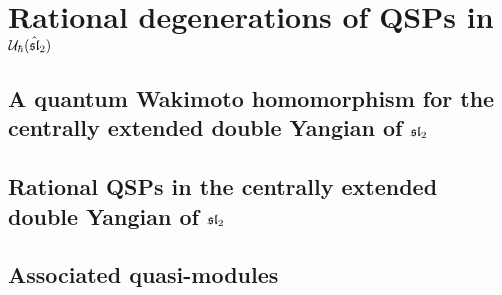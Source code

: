 \section{\texorpdfstring{Rational degenerations of QSPs in $\calU_{\hbar}(\hat{\sl}_2)$}{}}
    \subsection{\texorpdfstring{A quantum Wakimoto homomorphism for the centrally extended double Yangian of $\sl_2$}{}}

    \subsection{\texorpdfstring{Rational QSPs in the centrally extended double Yangian of $\sl_2$}{}}

    \subsection{Associated quasi-modules}